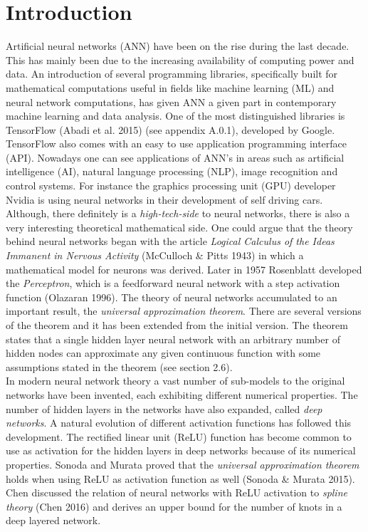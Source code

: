 \documentclass[11pt, letterpaper]{amsart}
\begin{document}
\section{Introduction}
Artificial neural networks (ANN) have been on the rise during the last decade. This has mainly been due to the increasing availability of computing power and data. An introduction of several programming libraries, specifically built for mathematical computations useful in fields like machine learning (ML) and neural network computations, has given ANN a given part in contemporary machine learning and data analysis. One of the most distinguished libraries is TensorFlow (Abadi et al. 2015) (see appendix A.0.1), developed by Google. TensorFlow also comes with an easy to use application programming interface (API). Nowadays one can see applications of ANN's in areas such as artificial intelligence (AI), natural language processing (NLP), image recognition and control systems. For instance the graphics processing unit (GPU) developer Nvidia is using neural networks in their development of self driving cars.
\\

Although, there definitely is a \textit{high-tech-side} to neural networks, there is also a very interesting theoretical mathematical side. One could argue that the theory behind neural networks began with the article \textit{Logical Calculus of the Ideas Immanent in Nervous Activity} (McCulloch \& Pitts 1943) in which a mathematical model for neurons was derived. Later in 1957 Rosenblatt developed the \textit{Perceptron}, which is a feedforward neural network with a step activation function (Olazaran 1996). The theory of neural networks accumulated to an important result, the \textit{universal approximation theorem}. There are several versions of the theorem and it has been extended from the initial version. The theorem states that a single hidden layer neural network with an arbitrary number of hidden nodes can approximate any given continuous function with some assumptions stated in the theorem (see section 2.6).
\\

In modern neural network theory a vast number of sub-models to the original networks have been invented, each exhibiting different numerical properties. The number of hidden layers in the networks have also expanded, called \textit{deep networks}. A natural evolution of different activation functions has followed this development. The rectified linear unit (ReLU) function has become common to use as activation for the hidden layers in deep networks because of its numerical properties. Sonoda and Murata proved that the \textit{universal approximation theorem} holds when using ReLU as activation function as well (Sonoda \& Murata 2015). Chen discussed the relation of neural networks with ReLU activation to \textit{spline theory} (Chen 2016) and derives an upper bound for the number of knots in a deep layered network.
\\
\end{document}
